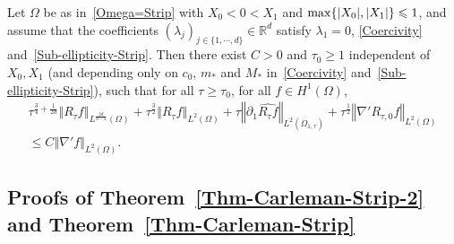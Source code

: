 \documentclass[AHL,Unicode,longabstracts]{cedram}
\newcommand*\R{\mathbb{R}}
\newcommand{\norm}[1]{\left\Vert#1\right\Vert}
\renewcommand{\leq}{\leqslant}
\renewcommand{\geq}{\geqslant}
\begin{document}
\begin{prop}\label{Prop-OpNorm-Est-R-tau}
Let $\Omega$ be as in~\eqref{Omega=Strip} with $X_0 \! <\! 0\! <\! X_1$ and $\max\{|X_0|, |X_1|\}\linebreak \leq 1$, and assume that the coefficients $(\lambda_j)_{j \in \{1,\cdots,d\}} \in \R^d$ satisfy $\lambda_1 = 0$, \eqref{Coercivity} and~\eqref{Sub-ellipticity-Strip}. Then there exist $C>0$ and $\tau_0 \geq 1$ independent of $X_0, X_1$ (and depending only on $c_0$, $m_*$ and $M_*$ in~\eqref{Coercivity} and~\eqref{Sub-ellipticity-Strip}), such that for all $\tau \geq \tau_0$, for all $f \in H^1(\Omega)$,
\begin{multline*}
\tau^{\frac{3}{4}+\frac{1}{2d}} \norm{R_{\tau} f}_{L^{\frac{2d}{d-2}}(\Omega)} +
\tau^{\frac{3}{2}} \norm{R_{\tau} f}_{L^{2}(\Omega)} +
\tau
\norm{\partial_1 \widehat{ R_{\tau} f}}_{L^2(\Omega_{1, \tau})} +
\tau^{\frac{1}{2}} \norm{\nabla' R_{\tau,0} f}_{L^2(\Omega)}\\
\leq C \norm{\nabla' f}_{L^2(\Omega)}.
\end{multline*}
\end{prop}

\subsection{Proofs of Theorem~\ref{Thm-Carleman-Strip-2} and Theorem~\ref{Thm-Carleman-Strip}}
\end{document}
